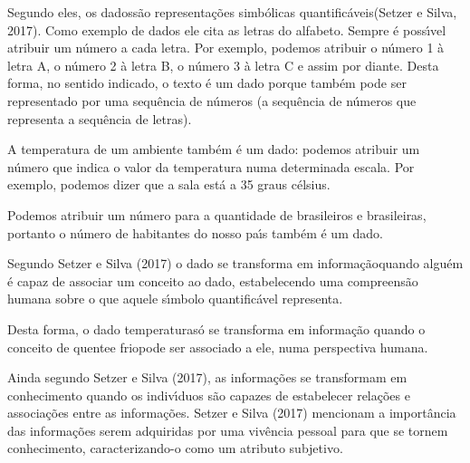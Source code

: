 \documentclass[
12pt,		%
openright,	%
twoside,  %
a4paper,			%
chapter=TITLE,		%
english,			%
french,				%
spanish,			%
brazil				%
]{USPSC-classe/USPSC}
\begin{document}
Segundo eles, os \textquotedbl dados\textquotedbl  s\~ao \textquotedbl representa\c{c}\~oes simb\'olicas quantific\'aveis\textquotedbl   (Setzer e Silva, 2017). Como exemplo de dados ele cita as letras do alfabeto. Sempre \'e poss\'{\i}vel atribuir um n\'umero a cada letra. Por exemplo, podemos atribuir o n\'umero 1 \`a letra A, o n\'umero 2 \`a letra B, o n\'umero 3 \`a letra C e assim por diante. Desta forma, no sentido indicado, o texto \'e um dado porque tamb\'em pode ser representado por uma sequ\^encia de n\'umeros (a sequ\^encia de n\'umeros que representa a sequ\^encia de letras).










A temperatura de um ambiente tamb\'em \'e um dado: podemos atribuir um n\'umero que indica o valor da temperatura numa determinada escala. Por exemplo, podemos dizer que a sala \textquotedbl est\'a a 35 graus c\'elsius\textquotedbl .










Podemos atribuir um n\'umero para a quantidade de brasileiros e brasileiras, portanto o n\'umero de habitantes do nosso pa\'{\i}s tamb\'em \'e um dado.










Segundo Setzer e Silva (2017) o dado se transforma em \textquotedbl informa\c{c}\~ao\textquotedbl  quando algu\'em \'e capaz de associar um conceito ao dado, estabelecendo uma compreens\~ao humana sobre o que aquele s\'{\i}mbolo quantific\'avel representa.










Desta forma, o dado \textquotedbl temperatura\textquotedbl  s\'o se transforma em informa\c{c}\~ao quando o conceito de \textquotedbl quente\textquotedbl  e \textquotedbl frio\textquotedbl  pode ser associado a ele, numa perspectiva humana.










Ainda segundo Setzer e Silva (2017), as informa\c{c}\~oes se transformam em conhecimento quando os indiv\'{\i}duos s\~ao capazes de estabelecer rela\c{c}\~oes e associa\c{c}\~oes entre as informa\c{c}\~oes.  Setzer e Silva (2017) mencionam a import\^ancia das informa\c{c}\~oes serem adquiridas por uma viv\^encia pessoal para que se tornem conhecimento, caracterizando-o como um atributo subjetivo.
\end{document}
